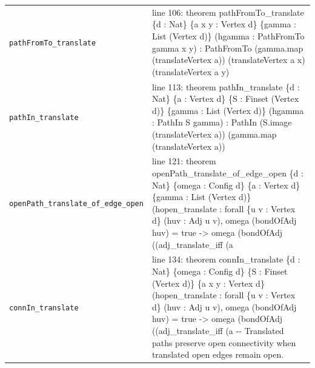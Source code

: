 \documentclass[10pt]{article}
\begin{document}
\begin{longtable}{>{\raggedright\arraybackslash}p{} >{\raggedright\arraybackslash}p{}}
\texttt{pathFromTo\_\allowbreak{}translate} & {\ttfamily\scriptsize line 106:\allowbreak{} theorem pathFromTo\_\allowbreak{}translate \{d :\allowbreak{} Nat\} \{a x y :\allowbreak{} Vertex d\} \{gamma :\allowbreak{} List (\allowbreak{}Vertex d)\allowbreak{}\} (\allowbreak{}hgamma :\allowbreak{} PathFromTo gamma x y)\allowbreak{} :\allowbreak{} PathFromTo (\allowbreak{}gamma.\allowbreak{}map (\allowbreak{}translateVertex a)\allowbreak{})\allowbreak{} (\allowbreak{}translateVertex a x)\allowbreak{} (\allowbreak{}translateVertex a y)\allowbreak{}} \\[0.45em]
\texttt{pathIn\_\allowbreak{}translate} & {\ttfamily\scriptsize line 113:\allowbreak{} theorem pathIn\_\allowbreak{}translate \{d :\allowbreak{} Nat\} \{a :\allowbreak{} Vertex d\} \{S :\allowbreak{} Finset (\allowbreak{}Vertex d)\allowbreak{}\} \{gamma :\allowbreak{} List (\allowbreak{}Vertex d)\allowbreak{}\} (\allowbreak{}hgamma :\allowbreak{} PathIn S gamma)\allowbreak{} :\allowbreak{} PathIn (\allowbreak{}S.\allowbreak{}image (\allowbreak{}translateVertex a)\allowbreak{})\allowbreak{} (\allowbreak{}gamma.\allowbreak{}map (\allowbreak{}translateVertex a)\allowbreak{})\allowbreak{}} \\[0.45em]
\texttt{openPath\_\allowbreak{}translate\_\allowbreak{}of\_\allowbreak{}edge\_\allowbreak{}open} & {\ttfamily\scriptsize line 121:\allowbreak{} theorem openPath\_\allowbreak{}translate\_\allowbreak{}of\_\allowbreak{}edge\_\allowbreak{}open \{d :\allowbreak{} Nat\} \{omega :\allowbreak{} Config d\} \{a :\allowbreak{} Vertex d\} \{gamma :\allowbreak{} List (\allowbreak{}Vertex d)\allowbreak{}\} (\allowbreak{}hopen\_\allowbreak{}translate :\allowbreak{} forall \{u v :\allowbreak{} Vertex d\} (\allowbreak{}huv :\allowbreak{} Adj u v)\allowbreak{},\allowbreak{} omega (\allowbreak{}bondOfAdj huv)\allowbreak{} =\allowbreak{} true -\allowbreak{}> omega (\allowbreak{}bondOfAdj (\allowbreak{}(\allowbreak{}adj\_\allowbreak{}translate\_\allowbreak{}iff (\allowbreak{}a} \\[0.45em]
\texttt{connIn\_\allowbreak{}translate} & {\ttfamily\scriptsize line 134:\allowbreak{} theorem connIn\_\allowbreak{}translate \{d :\allowbreak{} Nat\} \{omega :\allowbreak{} Config d\} \{S :\allowbreak{} Finset (\allowbreak{}Vertex d)\allowbreak{}\} \{a x y :\allowbreak{} Vertex d\} (\allowbreak{}hopen\_\allowbreak{}translate :\allowbreak{} forall \{u v :\allowbreak{} Vertex d\} (\allowbreak{}huv :\allowbreak{} Adj u v)\allowbreak{},\allowbreak{} omega (\allowbreak{}bondOfAdj huv)\allowbreak{} =\allowbreak{} true -\allowbreak{}> omega (\allowbreak{}bondOfAdj (\allowbreak{}(\allowbreak{}adj\_\allowbreak{}translate\_\allowbreak{}iff (\allowbreak{}a -\allowbreak{}-\allowbreak{} Translated paths preserve open connectivity when translated open edges remain open.\allowbreak{}} \\[0.45em]
\end{longtable}
\end{document}

